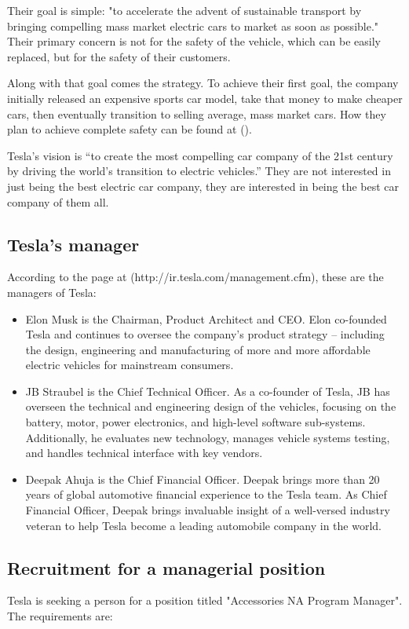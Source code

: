 \documentclass[12pt]{article}
\begin{document}
Their goal is simple: "to accelerate the advent of sustainable transport by bringing compelling mass market electric cars to market as soon as possible." Their primary concern is not for the safety of the vehicle, which can be easily replaced, but for the safety of their customers.

Along with that goal comes the strategy. To achieve their first goal, the company initially released an expensive sports car model, take that money to make cheaper cars, then eventually transition to selling average, mass market cars. How they plan to achieve complete safety can be found at (\cite{mu13}).

Tesla's vision is “to create the most compelling car company of the 21st century by driving the world’s transition to electric vehicles.” They are not interested in just being the best electric car company, they are interested in being the best car company of them all.

\subsection{Tesla's manager}

According to the page at (http://ir.tesla.com/management.cfm), these are the managers of Tesla:

\begin{itemize}
	\item{Elon Musk is the Chairman, Product Architect and CEO. Elon co-founded Tesla and continues to oversee the company's product strategy -- including the design, engineering and manufacturing of more and more affordable electric vehicles for mainstream consumers.}
	\item{JB Straubel is the Chief Technical Officer. As a co-founder of Tesla, JB has overseen the technical and engineering design of the vehicles, focusing on the battery, motor, power electronics, and high-level software sub-systems. Additionally, he evaluates new technology, manages vehicle systems testing, and handles technical interface with key vendors.}
	\item{Deepak Ahuja is the Chief Financial Officer. Deepak brings more than 20 years of global automotive financial experience to the Tesla team. As Chief Financial Officer, Deepak brings invaluable insight of a well-versed industry veteran to help Tesla become a leading automobile company in the world.}

\end{itemize}

\subsection{Recruitment for a managerial position}
Tesla is seeking a person for a position titled "Accessories NA Program Manager". The requirements are:
\end{document}
